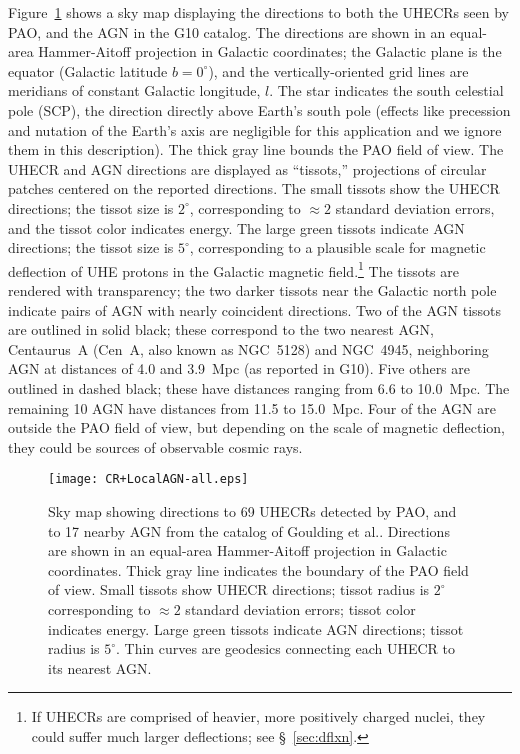 Figure~\ref{fig:skymap} shows a sky map displaying the
directions to both the UHECRs seen by PAO, and the AGN in the G10 catalog.
The directions are shown in an equal-area Hammer-Aitoff projection in
Galactic coordinates; the Galactic plane is the equator (Galactic latitude
$b=0^\circ$), and the vertically-oriented grid lines are meridians of
constant Galactic longitude, $l$.  The star indicates the south celestial
pole (SCP), the direction directly above Earth's south pole (effects like
precession and nutation of the Earth's axis are negligible for this
application and we ignore them in this description).  The thick gray line
bounds the PAO field of view.  The UHECR and AGN directions are displayed as
``tissots,'' projections of circular patches centered on the reported
directions.  The small tissots show the UHECR directions; the tissot size is
$2^\circ$, corresponding to $\approx 2$ standard deviation errors, and the
tissot color indicates energy.  The large green tissots indicate AGN
directions; the tissot size is $5^\circ$, corresponding to a plausible scale
for magnetic deflection of UHE protons in the Galactic magnetic
field.\footnote{If UHECRs are comprised of heavier, more positively charged
nuclei, they could suffer much larger deflections; see \S~\ref{sec:dflxn}.}
The tissots are rendered with transparency; the two darker tissots near the
Galactic north pole indicate pairs of AGN with nearly coincident directions.
Two of the AGN tissots are outlined in solid black; these correspond to the
two nearest AGN, Centaurus~A (Cen~A, also known as NGC~5128) and NGC~4945,
neighboring AGN at distances of 4.0 and 3.9~Mpc (as reported in G10).  Five
others are outlined in dashed black; these have distances ranging from 6.6
to 10.0~Mpc. The remaining 10 AGN have distances from 11.5 to 15.0~Mpc. 
Four of the AGN are outside the PAO field of view, but depending on the
scale of magnetic deflection, they could be sources of observable cosmic
rays.


\begin{figure}
\begin{centering}
\texttt{[image: CR+LocalAGN-all.eps]}
\end{centering}
\caption{Sky map showing directions to 69 UHECRs detected by PAO, and
to 17 nearby AGN from the catalog of Goulding et al..  Directions are
shown in an equal-area Hammer-Aitoff projection in Galactic coordinates.
Thick gray line indicates the boundary of the PAO field of view.
Small tissots show UHECR directions; tissot radius is $2^\circ$ corresponding
to $\approx 2$ standard deviation errors; tissot color indicates energy.
Large green tissots indicate AGN directions; tissot radius is $5^\circ$.
Thin curves are geodesics connecting each UHECR to its nearest AGN.}
\label{fig:skymap}
\end{figure}

